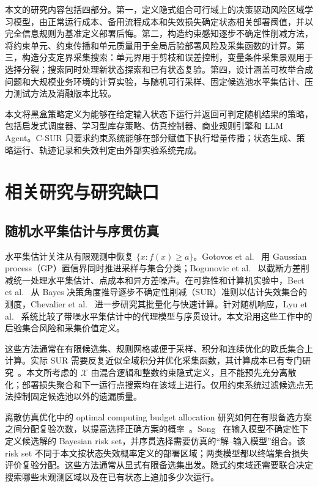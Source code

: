\documentclass[UTF8,11pt,a4paper,fontset=none]{ctexart}
\newcommand{\X}{\mathcal X}
\newcommand{\1}{\mathbf 1}
\begin{document}
本文的研究内容包括四部分。第一，定义隐式组合可行域上的决策驱动风险区域学习模型，由正常运行成本、备用流程成本和失效损失确定状态相关部署阈值，并以完全信息规则为基准定义部署后悔。第二，构造约束感知逐步不确定性削减方法，将约束单元、约束传播和单元质量用于全局后验部署风险及采集函数的计算。第三，构造分支定界采集搜索：单元界用于剪枝和误差控制，变量条件采集景观用于选择分裂；搜索同时处理新状态探索和已有状态复验。第四，设计涵盖可枚举合成问题和大规模业务环境的计算实验，与随机可行采样、固定候选池水平集估计、压力测试方法及消融版本比较。

本文将黑盒策略定义为能够在给定输入状态下运行并返回可判定随机结果的策略，包括启发式调度器、学习型库存策略、仿真控制器、商业规则引擎和 LLM Agent。C-SUR 只要求约束系统能够在部分赋值下执行增量传播；状态生成、策略运行、轨迹记录和失效判定由外部实验系统完成。

\section{相关研究与研究缺口}

\subsection{随机水平集估计与序贯仿真}

水平集估计关注从有限观测中恢复 $\{x:f(x)\geq a\}$。Gotovos et al.~\cite{gotovos2013} 用 Gaussian process（GP）置信界同时推进采样与集合分类；Bogunovic et al.~\cite{bogunovic2016} 以截断方差削减统一处理水平集估计、点成本和异方差噪声。在可靠性和计算机实验中，Bect et al.~\cite{bect2012} 从 Bayes 决策角度推导逐步不确定性削减（SUR）准则以估计失效集合的测度，Chevalier et al.~\cite{chevalier2014} 进一步研究其批量化与快速计算。针对随机响应，Lyu et al.~\cite{lyu2021} 系统比较了带噪水平集估计中的代理模型与序贯设计。本文沿用这些工作中的后验集合风险和采集价值定义。

这些方法通常在有限候选集、规则网格或便于采样、积分和连续优化的欧氏集合上计算。实际 SUR 需要反复近似全域积分并优化采集函数，其计算成本已有专门研究~\cite{chevalier2014}。本文所考虑的 $\X$ 由混合逻辑和整数约束隐式定义，且不能预先充分离散化；部署损失聚合和下一运行点搜索均在该域上进行。仅用约束系统过滤候选点无法控制固定候选池以外的遗漏质量。

离散仿真优化中的 optimal computing budget allocation 研究如何在有限备选方案之间分配复验次数，以提高选择正确方案的概率~\cite{chen2000}。Song~\cite{song2021} 在输入模型不确定性下定义候选解的 Bayesian risk set，并序贯选择需要仿真的“解--输入模型”组合。该 risk set 不同于本文按状态失效概率定义的部署区域；两类模型都以终端集合损失评价复验分配。这些方法通常从显式有限备选集出发。隐式约束域还需要联合决定搜索哪些未观测区域以及在已有状态上追加多少次运行。
\end{document}
